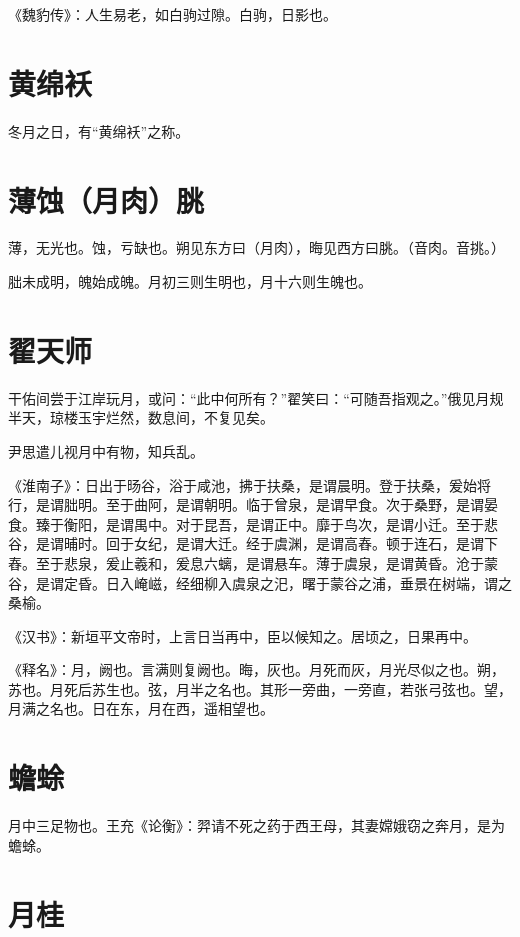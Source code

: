 \documentclass[a4paper,12pt,UTF8,twoside]{ctexbook}
\begin{document}
《魏豹传》：人生易老，如白驹过隙。白驹，日影也。

    \section{黄绵袄}

冬月之日，有“黄绵袄”之称。

	\section{薄蚀（月肉）脁}

薄，无光也。蚀，亏缺也。朔见东方曰（月肉），晦见西方曰脁。（音肉。音挑。）

胐未成明，魄始成魄。月初三则生明也，月十六则生魄也。

	\section{翟天师}

干佑间尝于江岸玩月，或问：“此中何所有？”翟笑曰：“可随吾指观之。”俄见月规半天，琼楼玉宇烂然，数息间，不复见矣。

尹思遣儿视月中有物，知兵乱。

《淮南子》：日出于旸谷，浴于咸池，拂于扶桑，是谓晨明。登于扶桑，爰始将行，是谓胐明。至于曲阿，是谓朝明。临于曾泉，是谓早食。次于桑野，是谓晏食。臻于衡阳，是谓禺中。对于昆吾，是谓正中。靡于鸟次，是谓小迁。至于悲谷，是谓晡时。回于女纪，是谓大迁。经于虞渊，是谓高舂。顿于连石，是谓下舂。至于悲泉，爰止羲和，爰息六螭，是谓悬车。薄于虞泉，是谓黄昏。沧于蒙谷，是谓定昏。日入崦嵫，经细柳入虞泉之汜，曙于蒙谷之浦，垂景在树端，谓之桑榆。

《汉书》：新垣平文帝时，上言日当再中，臣以候知之。居顷之，日果再中。

《释名》：月，阙也。言满则复阙也。晦，灰也。月死而灰，月光尽似之也。朔，苏也。月死后苏生也。弦，月半之名也。其形一旁曲，一旁直，若张弓弦也。望，月满之名也。日在东，月在西，遥相望也。

	\section{蟾蜍}

月中三足物也。王充《论衡》：羿请不死之药于西王母，其妻嫦娥窃之奔月，是为蟾蜍。

	\section{月桂}
\end{document}
